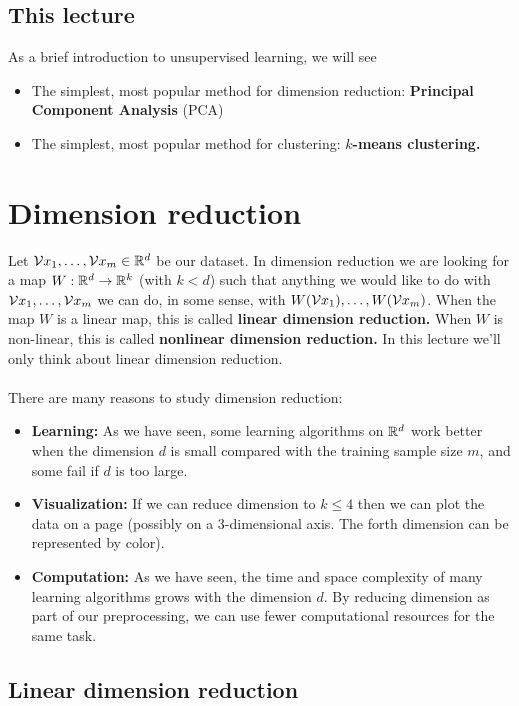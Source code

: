 \subsection{This lecture}

As a brief introduction to unsupervised learning, we will see 
\begin{itemize}
  \item The simplest, most
popular method for dimension reduction: {\bf Principal Component Analysis} 
(PCA)
\item The simplest, most popular method for clustering: {\bf $k$-means
  clustering.}
\end{itemize}


\section{Dimension reduction}

Let $\mathcal{V}{x}_1,\ldots,\mathcal{V}{x}_m\in\mathbb{R}^d$ be our dataset. 
In dimension reduction we are looking for a map $W:\mathbb{R}^d\to\mathbb{R}^k$ (with $k<d$)
such that anything we would like to do with $\mathcal{V}{x}_1,\ldots,\mathcal{V}{x}_m$
we can do, in some sense, with 
$W(\mathcal{V}{x}_1),\ldots,W(\mathcal{V}{x}_m)$. When the map $W$ is a linear map, this is
called {\bf linear dimension reduction.}
When $W$ is non-linear, this is called {\bf nonlinear dimension reduction.}
In this lecture we'll only think about linear dimension reduction.
\\~\\
There are many reasons to study dimension reduction:
\begin{itemize}
  \item {\bf Learning:} As we have seen, some learning algorithms on $\mathbb{R}^d$ 
    work better
    when the dimension $d$ is small compared with the training sample size $m$,
    and some fail if $d$ is too large.

  \item {\bf Visualization:} If we can reduce dimension to $k\leq 4$ then we can
    plot the data on a page (possibly on a 3-dimensional axis. The forth
    dimension can be represented by color).
  \item {\bf Computation:}
    As we have seen, the time and space complexity of many learning algorithms
    grows with the dimension $d$. By reducing dimension as part of our
    preprocessing, we can use fewer computational resources for the same task.
\end{itemize}

\subsection{Linear dimension reduction}

